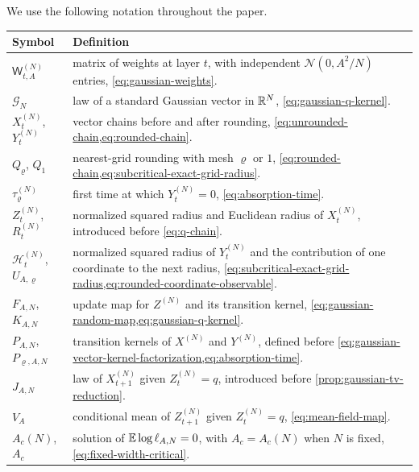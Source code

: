 \documentclass[11pt,reqno,a4paper]{article}
\newcommand{\Ee}{\E}
\begin{document}
We use the following notation throughout the paper.

\begin{table}[H]
  \centering
  \small
  \setlength{\tabcolsep}{4pt}
  \renewcommand{\arraystretch}{1.15}
  \begin{tabular}{@{}p{}p{}@{}}
    \toprule
    Symbol & Definition \\
    \midrule
    $\mathsf W_{t,A}^{(N)}$
      & matrix of weights at layer $t$, with independent
        $\mathcal N(0,A^2/N)$ entries,
        \cref{eq:gaussian-weights}. \\
    $\mathcal G_N$
      & law of a standard Gaussian vector in $\mathbb{R}^N$,
        \cref{eq:gaussian-q-kernel}. \\
    $X_t^{(N)}$, $Y_t^{(N)}$
      & vector chains before and after rounding,
        \cref{eq:unrounded-chain,eq:rounded-chain}. \\
    $Q_\varrho$, $Q_1$
      & nearest-grid rounding with mesh $\varrho$ or $1$,
        \cref{eq:rounded-chain,eq:subcritical-exact-grid-radius}. \\
    $\tau_\varrho^{(N)}$
      & first time at which $Y_t^{(N)}=0$, \cref{eq:absorption-time}. \\
    $Z_t^{(N)}$, $R_t^{(N)}$
      & normalized squared radius and Euclidean radius of $X_t^{(N)}$,
        introduced before \cref{eq:q-chain}. \\
    $\mathscr H_t^{(N)}$, $U_{A,\varrho}$
      & normalized squared radius of $Y_t^{(N)}$ and the contribution of one
        coordinate to the next radius,
        \cref{eq:subcritical-exact-grid-radius,eq:rounded-coordinate-observable}. \\
    $F_{A,N}$, $K_{A,N}$
      & update map for $Z^{(N)}$ and its transition kernel,
        \cref{eq:gaussian-random-map,eq:gaussian-q-kernel}. \\
    $P_{A,N}$, $P_{\varrho,A,N}$
      & transition kernels of $X^{(N)}$ and $Y^{(N)}$, defined before
        \cref{eq:gaussian-vector-kernel-factorization,eq:absorption-time}. \\
    $J_{A,N}$
      & law of $X_{t+1}^{(N)}$ given $Z_t^{(N)}=q$, introduced before
        \cref{prop:gaussian-tv-reduction}. \\
    $V_A$
      & conditional mean of $Z_{t+1}^{(N)}$ given $Z_t^{(N)}=q$,
        \cref{eq:mean-field-map}. \\
    $A_c(N)$, $A_c$
      & solution of $\Ee\log\ell_{A,N}=0$, with $A_c=A_c(N)$ when $N$ is
        fixed, \cref{eq:fixed-width-critical}. \\

\end{tabular}
\end{table}
\end{document}
